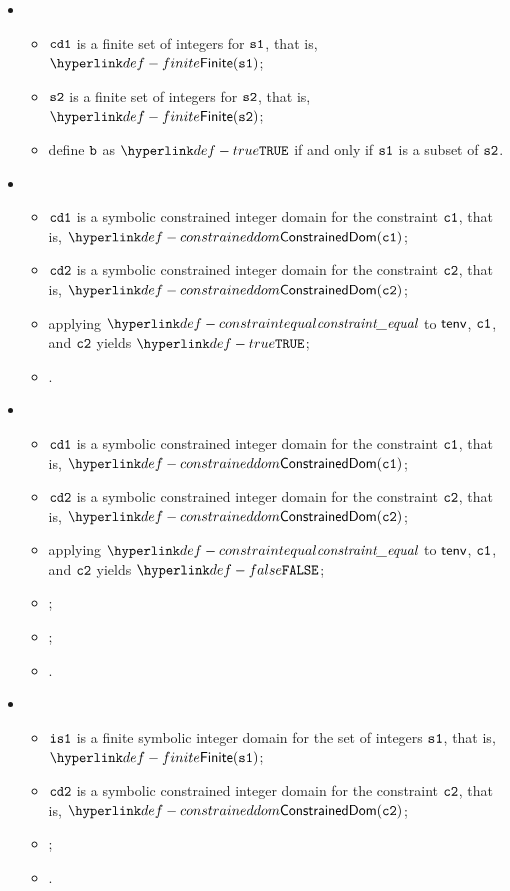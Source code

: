 \ProseParagraph
\OneApplies
\begin{itemize}
  \item {}
  \begin{itemize}
    \item $\texttt{cd1}$ is a finite set of integers for $\vsone$, that is, $\Finite(\vsone)$;
    \item $\vstwo$ is a finite set of integers for $\vstwo$, that is, $\Finite(\vstwo)$;
    \item define $\vb$ as $\True$ if and only if $\vsone$ is a subset of $\vstwo$.
  \end{itemize}

  \item {}
  \begin{itemize}
    \item $\texttt{cd1}$ is a symbolic constrained integer domain for the constraint $\vcone$, that is, $\ConstrainedDom(\vcone)$;
    \item $\texttt{cd2}$ is a symbolic constrained integer domain for the constraint $\vctwo$, that is, $\ConstrainedDom(\vctwo)$;
    \item applying $\constraintequal$ to $\tenv$, $\vcone$, and $\vctwo$ yields $\True$;
    \item \Proseeqdef{$\vb$}{$\True$}.
  \end{itemize}

  \item {}
  \begin{itemize}
    \item $\texttt{cd1}$ is a symbolic constrained integer domain for the constraint $\vcone$, that is, $\ConstrainedDom(\vcone)$;
    \item $\texttt{cd2}$ is a symbolic constrained integer domain for the constraint $\vctwo$, that is, $\ConstrainedDom(\vctwo)$;
    \item applying $\constraintequal$ to $\tenv$, $\vcone$, and $\vctwo$ yields $\False$;
    \item \Proseapproxconstraint{$\tenv$}{$\vcone$}{$\Over$}{$\vsone$};
    \item \Proseapproxconstraint{$\tenv$}{$\vctwo$}{$\Under$}{$\vstwo$};
    \item {}.
  \end{itemize}

  \item {}
  \begin{itemize}
    \item $\texttt{is1}$ is a finite symbolic integer domain for the set of integers $\vsone$, that is, $\Finite(\vsone)$;
    \item $\texttt{cd2}$ is a symbolic constrained integer domain for the constraint $\vctwo$, that is, $\ConstrainedDom(\vctwo)$;
    \item \ProseapproxconstraintsUnder{$\tenv$}{$\vctwo$}{$\vstwo$};
    \item {}.
  \end{itemize}


\end{itemize}
